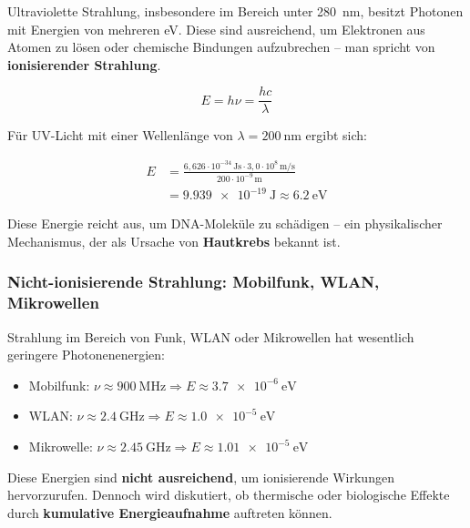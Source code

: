 Ultraviolette Strahlung, insbesondere im Bereich unter \SI{280}{\nano\meter}, besitzt Photonen mit Energien von mehreren \si{\electronvolt}. Diese sind ausreichend, um Elektronen aus Atomen zu lösen oder chemische Bindungen aufzubrechen – man spricht von \textbf{ionisierender Strahlung}.

\begin{equation*}
	E = h\nu = \frac{hc}{\lambda}
	\label{eq:photonenergie}
\end{equation*}

Für UV-Licht mit einer Wellenlänge von \(\lambda = \SI{200}{\nano\meter}\) ergibt sich:

\begin{align*}
	E &= \frac{6{,}626 \cdot 10^{-34}\,\si{\joule\second} \cdot 3{,}0 \cdot 10^8\,\si{\meter\per\second}}{200 \cdot 10^{-9}\,\si{\meter}} \\
	&= \SI{9.939e-19}{\joule} \approx \SI{6.2}{\electronvolt}
\end{align*}

Diese Energie reicht aus, um DNA-Moleküle zu schädigen – ein physikalischer Mechanismus, der als Ursache von \textbf{Hautkrebs} bekannt ist.

\subsubsection{Nicht-ionisierende Strahlung: \newline Mobilfunk, WLAN, Mikrowellen}

Strahlung im Bereich von Funk, WLAN oder Mikrowellen hat wesentlich geringere Photonenenergien:

\begin{itemize}
	\item Mobilfunk: $\nu \approx \SI{900}{\mega\hertz} \Rightarrow E \approx \SI{3.7e-6}{\electronvolt}$
	\item WLAN: $\nu \approx \SI{2.4}{\giga\hertz} \Rightarrow E \approx \SI{1.0e-5}{\electronvolt}$
	\item Mikrowelle: $\nu \approx \SI{2.45}{\giga\hertz} \Rightarrow E \approx \SI{1.01e-5}{\electronvolt}$
\end{itemize}

Diese Energien sind \textbf{nicht ausreichend}, um ionisierende Wirkungen hervorzurufen. Dennoch wird diskutiert, ob thermische oder biologische Effekte durch \textbf{kumulative Energieaufnahme} auftreten können.


